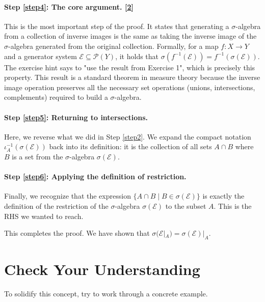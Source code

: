 \documentclass[11pt,a4paper]{article}
\begin{document}
\paragraph{Step \eqref{step4}: The core argument. \hyperlink{exp2}{[2]}}
This is the most important step of the proof. It states that generating a $\sigma$-algebra from a collection of inverse images is the same as taking the inverse image of the $\sigma$-algebra generated from the original collection. Formally, for a map $f: X \to Y$ and a generator system $\mathcal{E} \subseteq \mathcal{P}(Y)$, it holds that $\sigma(f^{-1}(\mathcal{E})) = f^{-1}(\sigma(\mathcal{E}))$.
The exercise hint says to "use the result from Exercise 1", which is precisely this property. This result is a standard theorem in measure theory because the inverse image operation preserves all the necessary set operations (unions, intersections, complements) required to build a $\sigma$-algebra.

\paragraph{Step \eqref{step5}: Returning to intersections.}
Here, we reverse what we did in Step \eqref{step2}. We expand the compact notation $\iota_A^{-1}(\sigma(\mathcal{E}))$ back into its definition: it is the collection of all sets $A \cap B$ where $B$ is a set from the $\sigma$-algebra $\sigma(\mathcal{E})$.

\paragraph{Step \eqref{step6}: Applying the definition of restriction.}
Finally, we recognize that the expression $\{A \cap B \mid B \in \sigma(\mathcal{E})\}$ is exactly the definition of the restriction of the $\sigma$-algebra $\sigma(\mathcal{E})$ to the subset $A$. This is the RHS we wanted to reach.

This completes the proof. We have shown that $\sigma(\mathcal{E}|_A) = \sigma(\mathcal{E})|_A$.

\section{Check Your Understanding}

To solidify this concept, try to work through a concrete example.
\end{document}
